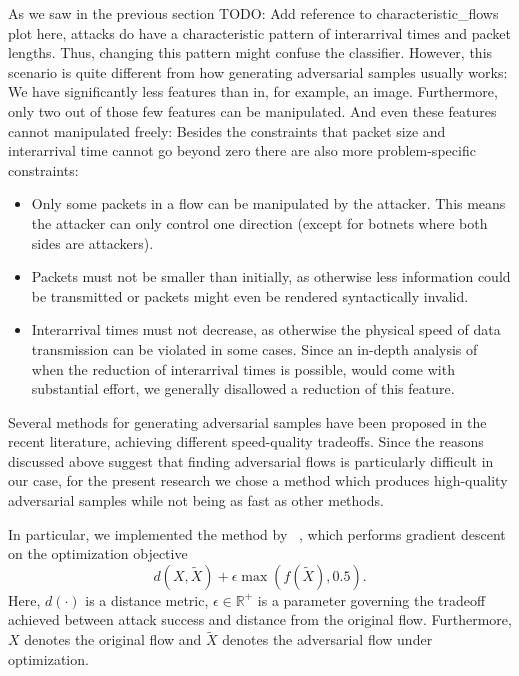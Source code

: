 \documentclass[sigconf,nonacm]{acmart}
\newcommand\note[2]{{\color{#1}#2}}
\newcommand\todo[1]{{\note{red}{TODO: #1}}}
\begin{document}
As we saw in the previous section \todo{Add reference to characteristic\_flows plot here}, attacks do have a characteristic pattern of interarrival times and packet lengths. Thus,  changing this pattern might confuse the classifier. However, this scenario is quite different from how generating adversarial samples usually works: We have significantly less features than in, for example, an image. Furthermore, only two out of those few features can be manipulated. And even these features cannot manipulated freely: Besides the constraints that packet size and interarrival time cannot go beyond zero there are also more problem-specific constraints:
\begin{itemize}
\item Only some packets in a flow can be manipulated by the attacker. This means the attacker can only control one direction (except for botnets where both sides are attackers). 
\item Packets must not be smaller than initially, as otherwise less information could be transmitted or packets might even be rendered syntactically invalid.
\item Interarrival times must not decrease, as otherwise the physical speed of data transmission can be violated in some cases. Since an in-depth analysis of when the reduction of interarrival times is possible, would come with substantial effort, we generally disallowed a reduction of this feature.
\end{itemize}

Several methods for generating adversarial samples have been proposed in the recent literature, achieving different speed-quality tradeoffs. Since the reasons discussed above suggest that finding adversarial flows is particularly difficult in our case, for the present research we chose a method which produces high-quality adversarial samples while not being as fast as other methods.

In particular, we implemented the method by \citeauthor{cw}~\cite{cw}, which performs gradient descent on the optimization objective 
\begin{equation}
d(X,\tilde X) + \epsilon  \max(f(\tilde X), 0.5).
\end{equation}
Here, $d(\cdot)$ is a distance metric, $\epsilon \in \mathbb R^+$ is a parameter governing the tradeoff achieved between attack success and distance from the original flow. Furthermore, $X$ denotes the original flow and $\tilde X$ denotes the adversarial flow under optimization. 
\end{document}
